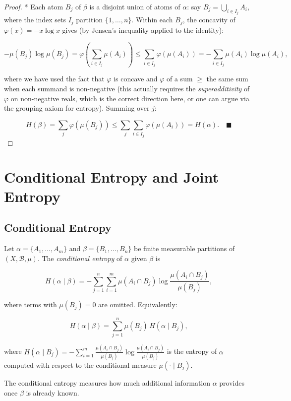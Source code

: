 \begin{proof}
* Each atom $B_j$ of $\beta$ is a disjoint union of atoms of $\alpha$: say $B_j = \bigcup_{i \in I_j} A_i$, where the index sets $I_j$ partition $\{1, \ldots, n\}$. Within each $B_j$, the concavity of $\varphi(x) = -x\log x$ gives (by Jensen's inequality applied to the identity):

\[
-\mu(B_j)\log\mu(B_j) = \varphi\!\left(\sum_{i \in I_j}\mu(A_i)\right) \leq \sum_{i \in I_j}\varphi(\mu(A_i)) = -\sum_{i \in I_j}\mu(A_i)\log\mu(A_i),
\]

where we have used the fact that $\varphi$ is concave and $\varphi$ of a sum $\geq$ the same sum when each summand is non-negative (this actually requires the \textit{superadditivity} of $\varphi$ on non-negative reals, which is the correct direction here, or one can argue via the grouping axiom for entropy). Summing over $j$:

\[
H(\beta) = \sum_j \varphi(\mu(B_j)) \leq \sum_j \sum_{i \in I_j} \varphi(\mu(A_i)) = H(\alpha). \quad \blacksquare
\]


\bigskip


\end{proof}

\section{Conditional Entropy and Joint Entropy}\label{sec:11.3}

\subsection{Conditional Entropy}\label{sec:11.3.1}

\begin{definition}\label{def:11.8}
Let $\alpha = \{A_1, \ldots, A_m\}$ and $\beta = \{B_1, \ldots, B_n\}$ be finite measurable partitions of $(X, \mathcal{B}, \mu)$. The \textit{conditional entropy} of $\alpha$ given $\beta$ is

\[
H(\alpha \mid \beta) = -\sum_{j=1}^n \sum_{i=1}^m \mu(A_i \cap B_j) \log \frac{\mu(A_i \cap B_j)}{\mu(B_j)},
\]

where terms with $\mu(B_j) = 0$ are omitted. Equivalently:

\[
H(\alpha \mid \beta) = \sum_{j=1}^n \mu(B_j) \, H(\alpha \mid B_j),
\]

where $H(\alpha \mid B_j) = -\sum_{i=1}^m \frac{\mu(A_i \cap B_j)}{\mu(B_j)} \log \frac{\mu(A_i \cap B_j)}{\mu(B_j)}$ is the entropy of $\alpha$ computed with respect to the conditional measure $\mu(\cdot \mid B_j)$.

The conditional entropy measures how much additional information $\alpha$ provides once $\beta$ is already known.
\end{definition}


